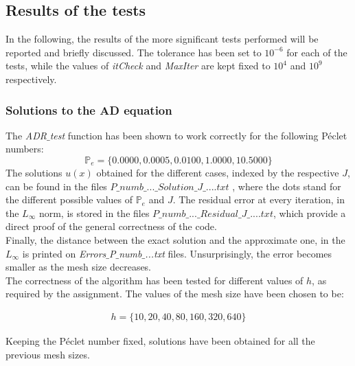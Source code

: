 \documentclass[11pt]{article}
\theoremstyle{theorem}
\theoremstyle{definition}
\begin{document}
\subsection{Results of the tests}
In the following, the results of the more significant tests performed will be reported and briefly discussed. The tolerance has been set to $10^{-6}$ for each of the tests, while the values of \emph{itCheck} and \emph{MaxIter} are kept fixed to $10^4$ and $10^9$ respectively.\\

\subsubsection{Solutions to the AD equation}
The \emph{ADR$\_$test} function has been shown to work correctly for the following  P\'{e}clet numbers:
$$\mathbb{P}_e=\lbrace 0.0000, 0.0005, 0.0100, 1.0000, 10.5000 \rbrace$$
The solutions $u(x)$ obtained for the different cases, indexed by the respective $J$, can be found in the files $P\_numb\_...\_Solution\_J\_....txt$ , where the dots stand for the different possible values of $\mathbb{P}_e$ and $J$. The residual error at every iteration, in the $L_\infty$ norm, is stored in the files $P\_numb\_...\_Residual\_J\_....txt$, which provide a direct proof of the general correctness of the code.\\
Finally, the distance between the exact solution and the approximate one, in the $L_\infty$ is printed on \emph{Errors$\_$P$\_$numb$\_$...txt} files. Unsurprisingly, the error becomes smaller as the mesh size decreases.\\
The correctness of the algorithm has been tested for different values of $h$, as required by the assignment. The values of the mesh size have been chosen to be:

\begin{align}
	\label{eqn:h-choice}
	h=\lbrace10, 20, 40, 80, 160, 320, 640\rbrace
\end{align}

Keeping the P\'{e}clet number fixed, solutions have been obtained for all the previous mesh sizes.\\ 
\end{document}
